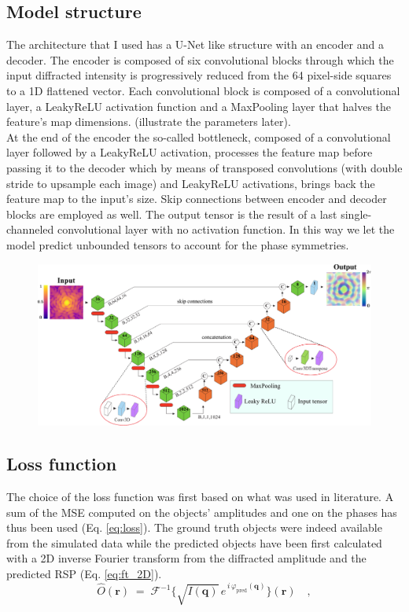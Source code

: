 \subsection{Model structure}
The architecture that I used has a U-Net like structure with an encoder and a decoder. 
The encoder is composed of six convolutional blocks through which the input diffracted intensity is progressively 
reduced from the 64 pixel-side squares to a 1D flattened vector. Each convolutional block is composed of a convolutional 
layer, a LeakyReLU activation function and a MaxPooling layer that halves the feature's map dimensions. (illustrate the 
parameters later). \\
At the end of the encoder the so-called bottleneck, composed of a convolutional layer followed by a LeakyReLU activation, 
processes the feature map before passing it to the decoder which by means of transposed convolutions (with double stride to
upsample each image) and LeakyReLU activations, 
brings back the feature map to the input's size. Skip connections between encoder and decoder blocks 
are employed as well. The output tensor is the result of a last single-channeled convolutional layer with no activation function. 
In this way we let the model predict unbounded tensors to account for the phase symmetries. 
\begin{figure}[H]
    \centering
    \includegraphics[width=\textwidth]{figures/Phasing/2D_model_arch.pdf}
    \caption{}
    \label{fig:model_2d_arch}
\end{figure}
\subsection{Loss function}
The choice of the loss function was first based on what was used in literature. 
A sum of the MSE computed on the objects' amplitudes and one on the phases has thus been used (Eq. \ref{eq:loss}). The ground truth 
objects were indeed available from the simulated data while the predicted objects have been first calculated with a 2D  
inverse Fourier transform from the diffracted amplitude and the predicted RSP (Eq. \ref{eq:ft_2D}). 
\begin{equation}
    \hat{O}(\mathbf{r})
    \;=\;
    \mathcal{F}^{-1}\!\bigl\{\sqrt{I(\mathbf{q})}\,e^{\,i\,\varphi_{\mathrm{pred}}(\mathbf{q})}\bigr\}(\mathbf{r})
    \quad,
    \label{eq:ft_2D}
\end{equation}

